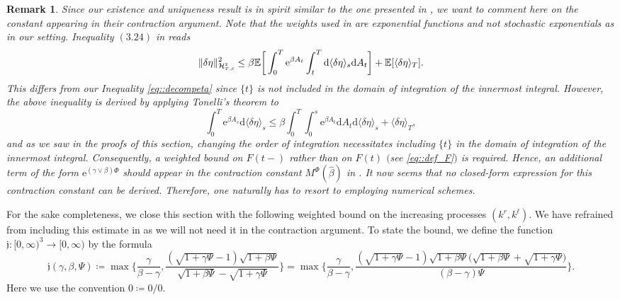 \documentclass[10pt]{article} %
\newtheorem{remark}[theorem]{Remark}
\newcommand\cH{\mathcal H}
\newcommand{\smalltext}[1]{\text{\fontsize{4}{4}\selectfont$#1$}}
\def \E{\mathbb{E}}
\newcommand{\1}{\mathbf{1}}
\def\d{\mathrm{d}}
\begin{document}
\begin{remark}\label{rem::discussion_constants}
	Since our existence and uniqueness result is in spirit similar to the one presented in {\rm\cite{papapantoleon2018existence}}, we want to comment here on the constant appearing in their contraction argument. Note that the weights used in {\rm\cite{papapantoleon2018existence}} are exponential functions and not stochastic exponentials as in our setting. {\rm Inequality $(3.24)$} in {\rm\cite{papapantoleon2018existence}} reads
	\begin{equation*}
		\|\delta\eta\|^2_{\cH^\smalltext{2}_{\smalltext{T}\smalltext{,}\smalltext{\beta}}} \leq \beta \E \bigg[ \int_0^T \mathrm{e}^{\beta A_t} \int_{t}^T \d \langle \delta\eta \rangle_s \d A_t \bigg] + \E [ \langle \delta\eta \rangle_T ].
	\end{equation*}
	This differs from our {\rm Inequality \eqref{eq::decompeta}} since $\{t\}$ is not included in the domain of integration of the innermost integral. However, the above inequality is derived by applying Tonelli's theorem to
	\begin{equation*}
		\int_0^T \mathrm{e}^{\beta A_s} \d \langle \delta\eta \rangle_s 
		\leq \beta \int_0^T\int_0^s \mathrm{e}^{\beta A_t} \d A_t \d \langle \delta\eta \rangle_s + \langle \delta\eta \rangle_T,
	\end{equation*} 
	and as we saw in the proofs of this section, changing the order of integration necessitates including $\{t\}$ in the domain of integration of the innermost integral. Consequently, a weighted bound on $F(t-)$ rather than on $F(t)$ $($see \eqref{eq::def_F}$)$ is required. Hence, an additional term of the form $\mathrm{e}^{(\gamma\lor\beta)\Phi}$ should appear in the contraction constant $M^\Phi(\hat\beta)$ in {\rm\cite{papapantoleon2018existence}}. It now seems that no closed-form expression for this contraction constant can be derived. Therefore, one naturally has to resort to employing numerical schemes.
\end{remark}

For the sake completeness, we close this section with the following weighted bound on the increasing processes $(k^r,k^\ell)$. We have refrained from including this estimate in  as we will not need it in the contraction argument. To state the bound, we define the function $\mathfrak{j} : [0,\infty)^3 \longrightarrow [0,\infty)$ by the formula
\begin{equation*}
	\mathfrak{j}(\gamma,\beta,\Psi) \coloneqq \max\Bigg\{\frac{\gamma}{\beta-\gamma}, \frac{(\sqrt{1+\gamma \Psi} - 1)\sqrt{1+\beta \Psi}}{\sqrt{1+\beta \Psi} - \sqrt{1+\gamma \Psi}}\Bigg\} = \max\Bigg\{\frac{\gamma}{\beta-\gamma}, \frac{(\sqrt{1+\gamma \Psi} - 1)\sqrt{1+\beta \Psi}\big(\sqrt{1+\beta \Psi}+\sqrt{1+\gamma \Psi}\big)}{(\beta-\gamma)\Psi}\Bigg\}.
\end{equation*}
Here we use the convention $0 \coloneqq 0/0$. 
\end{document}
